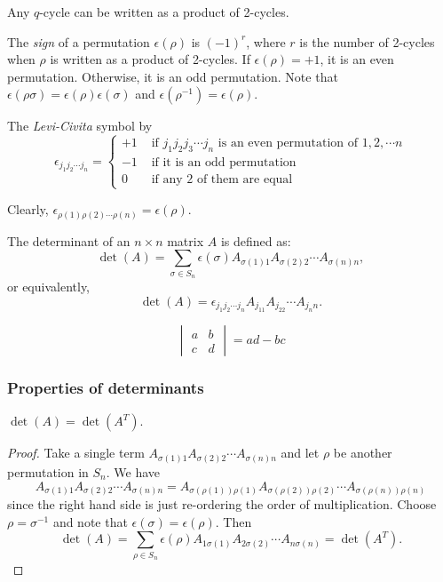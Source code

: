 \documentclass[a4paper]{article}
\begin{document}
\begin{prop}
  Any $q$-cycle can be written as a product of 2-cycles.
\end{prop}

\begin{defi}
  The \emph{sign} of a permutation $\epsilon(\rho)$ is $(-1)^r$, where $r$ is the number of 2-cycles when $\rho$ is written as a product of 2-cycles. If $\epsilon(\rho) = +1$, it is an even permutation. Otherwise, it is an odd permutation. Note that $\epsilon(\rho\sigma) = \epsilon(\rho)\epsilon(\sigma)$ and $\epsilon(\rho^{-1}) = \epsilon(\rho)$.
\end{defi}

\begin{defi}
  The \emph{Levi-Civita} symbol by
\[
\epsilon_{j_1j_2\cdots j_n} = \begin{cases}+1 & \text{ if } j_1j_2j_3\cdots j_n\text{ is an even permutation of }1, 2, \cdots n\\
    -1 & \text{ if it is an odd permutation}\\
    0 & \text{ if any 2 of them are equal}
  \end{cases}
\]

Clearly, $\epsilon_{\rho(1)\rho(2)\cdots \rho(n)} = \epsilon(\rho)$.
\end{defi}

\begin{defi}[Determinant]
  The determinant of an $n\times n$ matrix $A$ is defined as:
\[
\det (A) = \sum_{\sigma\in S_n} \epsilon(\sigma) A_{\sigma(1)1}A_{\sigma(2)2}\cdots A_{\sigma(n)n},
\]
or equivalently,
\[
\det(A) = \epsilon_{j_1j_2\cdots j_n}A_{j_11}A_{j_22}\cdots A_{j_nn}.
\]
\end{defi}

\begin{prop}
  \[
  \begin{vmatrix}
    a & b\\
    c & d
  \end{vmatrix} = ad - bc
  \]
\end{prop}

\subsubsection{Properties of determinants}
\begin{prop}
  $\det (A) = \det (A^T)$.
\end{prop}

\begin{proof}
  Take a single term $A_{\sigma(1)1}A_{\sigma(2)2}\cdots A_{\sigma(n)n}$ and let $\rho$ be another permutation in $S_n$. We have
  \[
  A_{\sigma(1)1}A_{\sigma(2)2}\cdots A_{\sigma(n)n} = A_{\sigma(\rho(1))\rho(1)}A_{\sigma(\rho(2))\rho(2)}\cdots A_{\sigma(\rho(n))\rho(n)}
  \]
  since the right hand side is just re-ordering the order of multiplication. Choose $\rho = \sigma^{-1}$ and note that $\epsilon(\sigma) = \epsilon(\rho)$. Then
  \[
  \det(A) = \sum_{\rho\in S_n} \epsilon(\rho) A_{1\sigma(1)}A_{2\sigma(2)}\cdots A_{n\sigma(n)} = \det (A^T).
  \]
\end{proof}
\end{document}
